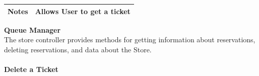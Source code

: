 \documentclass[a4paper, 12pt, oneside, table]{article}
\begin{document}
\begin{tabularx}{\linewidth}{| l | X |}
    \hline
    \textbf{Notes} & Allows User to get a ticket \\

    \hline
    
\end{tabularx}

\textbf{\large Queue Manager}\\
The store controller provides methods for getting information about reservations, deleting reservations, and data about the Store.\\
\\
\textbf{Delete a Ticket}
\vspace{-2em}
\begin{tabularx}{0.8\textwidth} { 
  | >{\raggedright\arraybackslash}X 
  | >{\centering\arraybackslash}X 
  | >{\raggedleft\arraybackslash}X | }
 \hline
 \hline
 
\hline
\hline
 
\hline
\end{tabularx}
\end{document}
